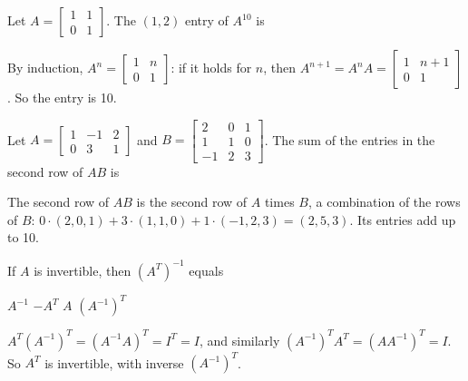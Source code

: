 \begin{question}[id=mat-9]
Let $A = \begin{bmatrix} 1 & 1 \\ 0 & 1 \end{bmatrix}$. The $(1,2)$ entry of $A^{10}$ is
\begin{solution}
By induction, $A^n = \begin{bmatrix} 1 & n \\ 0 & 1 \end{bmatrix}$: if it holds for $n$, then $A^{n+1} = A^nA = \begin{bmatrix} 1 & n + 1 \\ 0 & 1 \end{bmatrix}$. So the entry is 10.
\end{solution}
\end{question}

\begin{question}[id=mat-10]
Let $A = \begin{bmatrix} 1 & -1 & 2 \\ 0 & 3 & 1 \end{bmatrix}$ and $B = \begin{bmatrix} 2 & 0 & 1 \\ 1 & 1 & 0 \\ -1 & 2 & 3 \end{bmatrix}$. The sum of the entries in the second row of $AB$ is
\begin{solution}
The second row of $AB$ is the second row of $A$ times $B$, a combination of the rows of $B$: $0 \cdot (2, 0, 1) + 3 \cdot (1, 1, 0) + 1 \cdot (-1, 2, 3) = (2, 5, 3)$. Its entries add up to 10.
\end{solution}
\end{question}

\begin{question}[id=mat-11]
If $A$ is invertible, then $(A^T)^{-1}$ equals
\begin{options}
  \option $A^{-1}$
  \option $-A^T$
  \option $A$
  \correct $(A^{-1})^T$
\end{options}
\begin{solution}
$A^T (A^{-1})^T = (A^{-1}A)^T = I^T = I$, and similarly $(A^{-1})^T A^T = (AA^{-1})^T = I$. So $A^T$ is invertible, with inverse $(A^{-1})^T$.
\end{solution}
\end{question}

